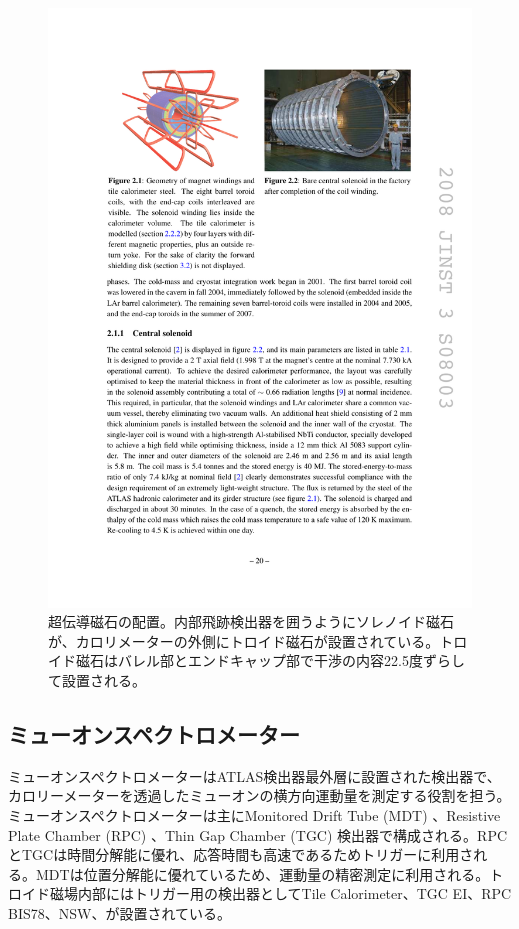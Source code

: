     \begin{figure} 
        \centering
        \includegraphics[width=16cm]{fig/Intro/ATLASmagnet.pdf}
        \caption[超伝導磁石の配置]{超伝導磁石の配置\cite{JINST:2008}。内部飛跡検出器を囲うようにソレノイド磁石が、カロリメーターの外側にトロイド磁石が設置されている。トロイド磁石はバレル部とエンドキャップ部で干渉の内容22.5度ずらして設置される。}
        \label{ATLASmagnet}
    \end{figure}
  
    \subsection{ミューオンスペクトロメーター}
ミューオンスペクトロメーターはATLAS検出器最外層に設置された検出器で、カロリーメーターを透過したミューオンの横方向運動量を測定する役割を担う。ミューオンスペクトロメーターは主にMonitored Drift Tube (MDT) 、Resistive Plate Chamber (RPC) 、Thin Gap Chamber (TGC)  検出器で構成される。RPCとTGCは時間分解能に優れ、応答時間も高速であるためトリガーに利用される。MDTは位置分解能に優れているため、運動量の精密測定に利用される。トロイド磁場内部にはトリガー用の検出器としてTile Calorimeter、TGC EI、RPC BIS78、NSW、が設置されている。

